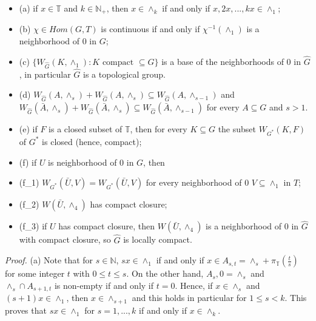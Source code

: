 \documentclass[12pt]{article}
\begin{document}
    \begin{itemize}

        \item (a) if $x \in \mathbb{T}$ and $k \in \mathbb{N}_+$, then $x \in \wedge_k$ if and only if $x, 2x, . . . , kx \in \wedge_1$;
        
        \item (b) $\chi \in Hom (G,T)$ is continuous if and only if $\chi^{-1} (\wedge_1)$ is a neighborhood of 0 in $G$;
        
        \item (c) $\{W_{\hat{G}}(K,\wedge_1) : K \text{ compact } \subseteq G\}$ is a base of the neighborhoods of 0 in $\hat{G}$, in particular $\hat{G}$ is a topological
        group.        
        
        \item (d) $W_{\hat{G}}(A,\wedge_s) + W_{\hat{G}}(A,\wedge_s) \subseteq W_{\hat{G}}(A,\wedge_{s-1})$ and $W_{\hat{G}}(\bar{A},\wedge_s) + W_{\hat{G}}(\bar{A},\wedge_s) ⊆ W_{\hat{G}}(\bar{A},\wedge_{s-1})$ for every $A \subseteq G$
        and $s > 1$.        
        
        \item (e) if $F$ is a closed subset of $\mathbb{T}$, then for every $K \subseteq G$ the subset $W_{G^*}(K, F)$ of $G^*$ is closed (hence, compact);        
        
        \item (f) if $U$ is neighborhood of 0 in $G$, then
            
            \item (f_1) $W_{G^*}(\bar{U}, V) = W_{G^*} (\bar{U}, V)$ for every neighborhood of 0 $V \subseteq \wedge_1$ in $T$;
            
            \item (f_2) $W(\bar{U},\wedge_4)$ has compact closure;
            
            \item (f_3)  if $U$ has compact closure, then $W(\bar{U},\wedge_4)$ is a neighborhood of 0 in $\hat{G}$ with compact closure, so $\hat{G}$ is
            locally compact.

    \end{itemize}


    \emph{Proof.} (a) Note that for $s \in \mathbb{N}$, $sx \in \wedge_1$ if and only if $x \in A_{s,t} = \wedge_s+\pi_{\mathbb{T}}(\frac{t}{s})$ for some integer $t$ with $0 \leq t \leq s$. On
the other hand, $A_s, 0 = \wedge_s$ and $\wedge_s \cap A_{s+1,t}$ is non-empty if and only if $t = 0$. Hence, if $x \in \wedge_s$ and $(s+ 1)x \in \wedge_1$,
then $x \in \wedge_{s+1}$ and this holds in particular for $1 \leq s < k$. This proves that $sx \in \wedge_1$ for $s = 1, . . . , k$ if and only
if $x \in \wedge_k$.
\end{document}
